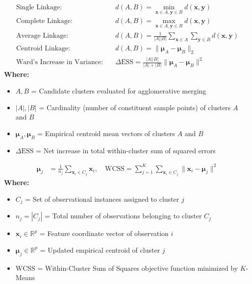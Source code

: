 \begin{formulabox}
\begin{align*}
    \text{Single Linkage:} \quad & d(A, B) = \min_{\mathbf{x} \in A, \mathbf{y} \in B} d(\mathbf{x}, \mathbf{y}) \\[2pt]
    \text{Complete Linkage:} \quad & d(A, B) = \max_{\mathbf{x} \in A, \mathbf{y} \in B} d(\mathbf{x}, \mathbf{y}) \\[2pt]
    \text{Average Linkage:} \quad & d(A, B) = \frac{1}{|A||B|} \sum_{\mathbf{x} \in A} \sum_{\mathbf{y} \in B} d(\mathbf{x}, \mathbf{y}) \\[2pt]
    \text{Centroid Linkage:} \quad & d(A, B) = \|\boldsymbol{\mu}_A - \boldsymbol{\mu}_B\|_2 \\[2pt]
    \text{Ward's Increase in Variance:} \quad & \Delta \text{ESS} = \frac{|A||B|}{|A| + |B|} \|\boldsymbol{\mu}_A - \boldsymbol{\mu}_B\|^2
\end{align*}
\textbf{Where:}
\begin{itemize}[noitemsep, topsep=1pt]
    \item $A, B$ = Candidate clusters evaluated for agglomerative merging
    \item $|A|, |B|$ = Cardinality (number of constituent sample points) of clusters $A$ and $B$
    \item $\boldsymbol{\mu}_A, \boldsymbol{\mu}_B$ = Empirical centroid mean vectors of clusters $A$ and $B$
    \item $\Delta \text{ESS}$ = Net increase in total within-cluster sum of squared errors
\end{itemize}
\end{formulabox}

\begin{formulabox}
\begin{align*}
    \boldsymbol{\mu}_j &= \frac{1}{n_j} \sum_{\mathbf{x}_i \in C_j} \mathbf{x}_i, \quad \text{WCSS} = \sum_{j=1}^K \sum_{\mathbf{x}_i \in C_j} \|\mathbf{x}_i - \boldsymbol{\mu}_j\|^2
\end{align*}
\textbf{Where:}
\begin{itemize}[noitemsep, topsep=1pt]
    \item $C_j$ = Set of observational instances assigned to cluster $j$
    \item $n_j = |C_j|$ = Total number of observations belonging to cluster $C_j$
    \item $\mathbf{x}_i \in \mathbb{R}^p$ = Feature coordinate vector of observation $i$
    \item $\boldsymbol{\mu}_j \in \mathbb{R}^p$ = Updated empirical centroid of cluster $j$
    \item $\text{WCSS}$ = Within-Cluster Sum of Squares objective function minimized by $K$-Means
\end{itemize}
\end{formulabox}

